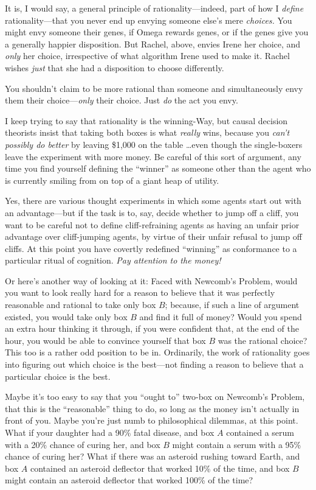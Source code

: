 {
 It is, I would say, a general principle of rationality---indeed,
part of how I \textit{define} rationality---that you never end up
envying someone else's mere \textit{choices.} You might
envy someone their genes, if Omega rewards genes, or if the genes give
you a generally happier disposition. But Rachel, above, envies Irene
her choice, and \textit{only} her choice, irrespective of what
algorithm Irene used to make it. Rachel wishes \textit{just} that she
had a disposition to choose differently.}

{
 You shouldn't claim to be more rational than
someone and simultaneously envy them their choice---\textit{only} their
choice. Just \textit{do} the act you envy.}

{
 I keep trying to say that rationality is the winning-Way, but
causal decision theorists insist that taking both boxes is what
\textit{really} wins, because you \textit{can't
possibly do better} by leaving \$1,000 on the table \ldots even though
the single-boxers leave the experiment with more money. Be careful of
this sort of argument, any time you find yourself defining the
``winner'' as someone other than the
agent who is currently smiling from on top of a giant heap of utility.}

{
 Yes, there are various thought experiments in which some agents
start out with an advantage---but if the task is to, say, decide
whether to jump off a cliff, you want to be careful not to define
cliff-refraining agents as having an unfair prior advantage over
cliff-jumping agents, by virtue of their unfair refusal to jump off
cliffs. At this point you have covertly redefined
``winning'' as conformance to a
particular ritual of cognition. \textit{Pay attention to the money!}}

{
 Or here's another way of looking at it: Faced with
Newcomb's Problem, would you want to look really hard
for a reason to believe that it was perfectly reasonable and rational
to take only box $B$; because, if such a line of argument existed, you
would take only box $B$ and find it full of money? Would you spend an
extra hour thinking it through, if you were confident that, at the end
of the hour, you would be able to convince yourself that box $B$ was the
rational choice? This too is a rather odd position to be in.
Ordinarily, the work of rationality goes into figuring out which choice
is the best---not finding a reason to believe that a particular choice
is the best.}

{
 Maybe it's too easy to say that you
``ought to'' two-box on
Newcomb's Problem, that this is the
``reasonable'' thing to do, so long
as the money isn't actually in front of you. Maybe
you're just numb to philosophical dilemmas, at this
point. What if your daughter had a 90\% fatal disease, and box $A$
contained a serum with a 20\% chance of curing her, and box $B$ might
contain a serum with a 95\% chance of curing her? What if there was an
asteroid rushing toward Earth, and box $A$ contained an asteroid
deflector that worked 10\% of the time, and box $B$ might contain an
asteroid deflector that worked 100\% of the time?}

